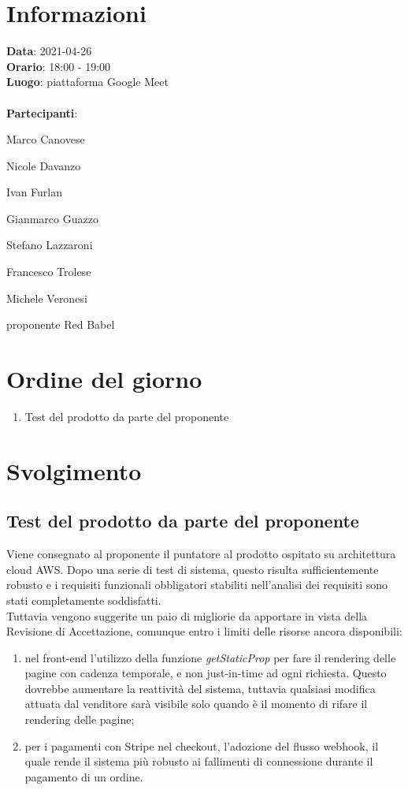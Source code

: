 \section{Informazioni}
\textbf{Data}: 2021-04-26 \\
\textbf{Orario}: 18:00 - 19:00\\
\textbf{Luogo}: piattaforma Google Meet \\\\
\textbf{Partecipanti}:\begin{list}{*}{\setlength{\itemsep}{0cm}}
	\item Marco Canovese
	\item Nicole Davanzo
	\item Ivan Furlan
	\item Gianmarco Guazzo
	\item Stefano Lazzaroni
	\item Francesco Trolese
	\item Michele Veronesi
	\item proponente Red Babel
\end{list}

\section{Ordine del giorno}
\begin{enumerate}
	\item Test del prodotto da parte del proponente
\end{enumerate}

\section{Svolgimento}
\subsection{Test del prodotto da parte del proponente} \label{_svolgimento}
Viene consegnato al proponente il puntatore al prodotto ospitato su architettura cloud AWS.
Dopo una serie di test di sistema, questo risulta sufficientemente robusto e i requisiti funzionali obbligatori stabiliti
nell'analisi dei requisiti sono stati completamente soddisfatti.\\
Tuttavia vengono suggerite un paio di migliorie da apportare in vista della Revisione di Accettazione, comunque entro i limiti
delle risorse ancora disponibili:
\begin{enumerate}
	\item nel front-end l'utilizzo della funzione \textit{getStaticProp} per fare il rendering delle pagine con cadenza temporale, e non just-in-time
		  ad ogni richiesta. Questo dovrebbe aumentare la reattività del sistema, tuttavia qualsiasi modifica attuata dal venditore sarà visibile solo quando
		  è il momento di rifare il rendering delle pagine;
	\item per i pagamenti con Stripe nel checkout, l'adozione del flusso webhook, il quale rende il sistema più robusto ai fallimenti di connessione durante il pagamento di un ordine.
\end{enumerate}

